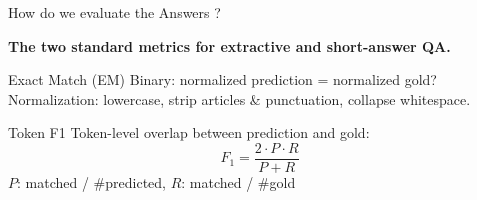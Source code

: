 \documentclass[aspectratio=169, xcolor=table]{beamer}
\newif\ifanimated
\newcommand{\cpause}{\ifanimated\pause\fi}
\begin{document}
\begin{frame}[shrink=10]{How do we evaluate the Answers ?}
\cpause
\textbf{The two standard metrics for extractive and short-answer QA.}

\vspace{0.7em}
\begin{block}{Exact Match (EM)}
Binary: normalized prediction = normalized gold?\\[0.3em]
\footnotesize Normalization: lowercase, strip articles \& punctuation, collapse whitespace.
\end{block}

\vspace{0.4em}
\begin{block}{Token F1}
Token-level overlap between prediction and gold:
\[ F_1 = \frac{2 \cdot P \cdot R}{P + R} \]
\footnotesize $P$: matched / \#predicted, \quad $R$: matched / \#gold
\end{block}
\end{frame}



\end{document}
